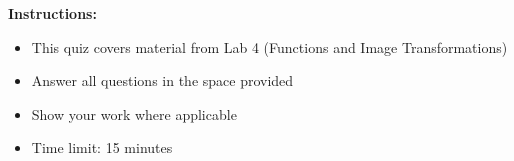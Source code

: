 \documentclass{csexam}
\begin{document}
\maketitle

\begin{rules}
\textbf{Instructions:}
\begin{itemize}
    \item This quiz covers material from Lab 4 (Functions and Image Transformations)
    \item Answer all questions in the space provided
    \item Show your work where applicable
    \item Time limit: 15 minutes
\end{itemize}
\end{rules}

\vspace{0.2in}

\showgrade

\newpage
\end{document}
